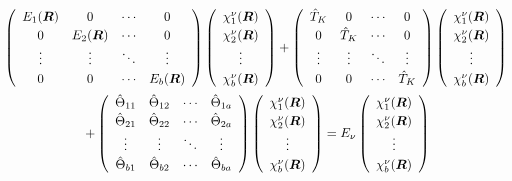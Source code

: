 \documentclass[9pt]{report}
\begin{document}
\begin{align}
\renewcommand{\arraystretch}{1.2}
\left(\begin{array}{cccc}
E_{1}(\boldsymbol{R}) & 0  &  \cdots  &  0
\\
0 & E_{2}(\boldsymbol{R})  &  \cdots  &  0
\\
\vdots  &  \vdots  &  \ddots  &  \vdots
\\
0  &  0  &  \cdots  &  E_{b}(\boldsymbol{R})
\\
\end{array}\right)
\left(\begin{array}{c}
\chi_{1}^{\nu}(\boldsymbol{R})
\\
\chi_{2}^{\nu}(\boldsymbol{R})
\\
\vdots
\\
\chi_{b}^{\nu}(\boldsymbol{R})
\\
\end{array}\right)
+
\left(\begin{array}{cccc}
\hat{T}_{K} & 0  &  \cdots  &  0
\\
0 & \hat{T}_{K}  &  \cdots  &  0
\\
\vdots  &  \vdots  &  \ddots  &  \vdots
\\
0  &  0  &  \cdots  &  \hat{T}_{K}
\\
\end{array}\right)
\left(\begin{array}{c}
\chi_{1}^{\nu}(\boldsymbol{R})
\\
\chi_{2}^{\nu}(\boldsymbol{R})
\\
\vdots
\\
\chi_{b}^{\nu}(\boldsymbol{R})
\\
\end{array}\right)
\\
+
\renewcommand{\arraystretch}{1.2}
\left(\begin{array}{cccc}
\hat{\Theta}_{11} & \hat{\Theta}_{12}  &  \cdots  &  \hat{\Theta}_{1a}
\\
\hat{\Theta}_{21} & \hat{\Theta}_{22}  &  \cdots  &  \hat{\Theta}_{2a}
\\
\vdots  &  \vdots  &  \ddots  &  \vdots
\\
\hat{\Theta}_{b1}  &  \hat{\Theta}_{b2}  &  \cdots  &  \hat{\Theta}_{ba}
\\
\end{array}\right)
\left(\begin{array}{c}
\chi_{1}^{\nu}(\boldsymbol{R})
\\
\chi_{2}^{\nu}(\boldsymbol{R})
\\
\vdots
\\
\chi_{b}^{\nu}(\boldsymbol{R})
\\
\end{array}\right)
= E_{\nu}
\left(\begin{array}{c}
\chi_{1}^{\nu}(\boldsymbol{R})
\\
\chi_{2}^{\nu}(\boldsymbol{R})
\\
\vdots
\\
\chi_{b}^{\nu}(\boldsymbol{R})
\\
\end{array}\right)\qquad\qquad\qquad
\end{align}
\end{document}

